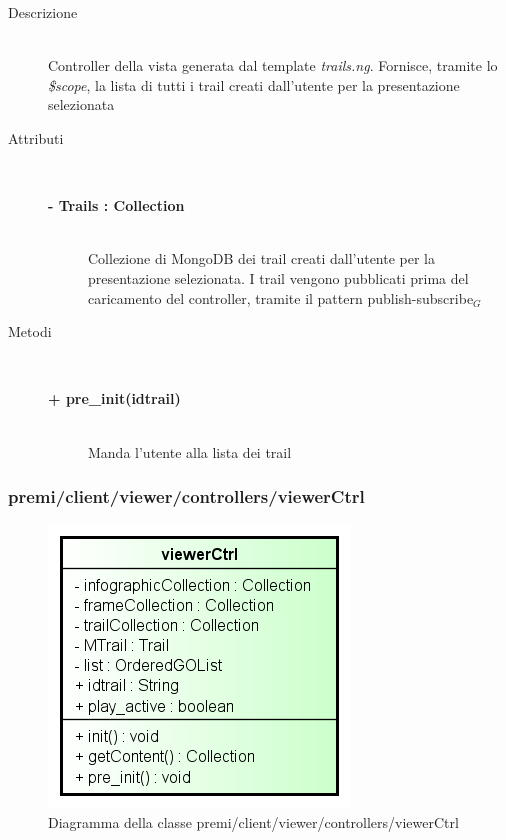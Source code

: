 \begin{description}
\item[Descrizione] \hfill \\
	Controller della vista generata dal template \textit{trails.ng}. Fornisce, tramite lo \textit{\$scope}, la lista di tutti i trail creati dall'utente per la presentazione selezionata
	

	
\item[Attributi] \hfill \\
	\begin{description}
		\item[\textbf{- Trails : Collection			}] \hfill \\
			Collezione di MongoDB dei trail creati dall'utente per la presentazione selezionata. I trail vengono pubblicati prima del caricamento del controller, tramite il pattern publish-subscribe$_G$
	\end{description}
	
	
\item[Metodi] \hfill \\

	\begin{description}
		\item[\textbf{\color{blue}+ pre\_init(idtrail)			}] \hfill \\
			Manda l'utente alla lista dei trail
	\end{description}	

\end{description}



\subsubsection{premi/client/viewer/controllers/viewerCtrl}
\begin{figure}[h]
\begin{center}
\includegraphics[scale=0.55]{img/diacla/viewerCtrl.png}
\caption{Diagramma della classe premi/client/viewer/controllers/viewerCtrl}
\end{center}
\end{figure}


